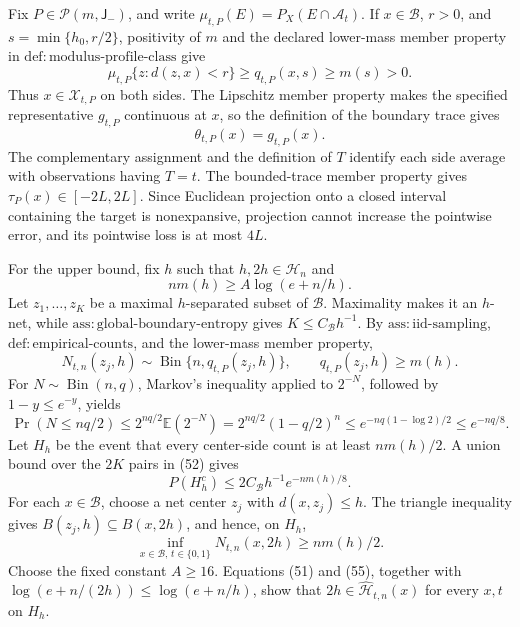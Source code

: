 Fix \(P\in\mathcal P(m,\mathsf J_{-})\), and write \(\mu_{t,P}(E)=P_X(E\cap\mathcal A_t)\). If \(x\in\mathcal B\), \(r>0\), and \(s=\min\{h_0,r/2\}\), positivity of \(m\) and the declared lower-mass member property in \(\mathrm{def:modulus\text{-}profile\text{-}class}\) give
\[
 \mu_{t,P}\{z:d(z,x)<r\}\ge q_{t,P}(x,s)\ge m(s)>0. \tag{49}
\]
Thus \(x\in\mathcal X_{t,P}\) on both sides. The Lipschitz member property makes the specified representative \(g_{t,P}\) continuous at \(x\), so the definition of the boundary trace gives
\[
 \theta_{t,P}(x)=g_{t,P}(x). \tag{50}
\]
The complementary assignment and the definition of \(T\) identify each side average with observations having \(T=t\). The bounded-trace member property gives \(\tau_P(x)\in[-2L,2L]\). Since Euclidean projection onto a closed interval containing the target is nonexpansive, projection cannot increase the pointwise error, and its pointwise loss is at most \(4L\).

For the upper bound, fix \(h\) such that \(h,2h\in\mathcal H_n\) and
\[
 nm(h)\ge A\log(e+n/h). \tag{51}
\]
Let \(z_1,\ldots,z_K\) be a maximal \(h\)-separated subset of \(\mathcal B\). Maximality makes it an \(h\)-net, while \(\mathrm{ass:global\text{-}boundary\text{-}entropy}\) gives \(K\le C_{\mathcal B}h^{-1}\). By \(\mathrm{ass:iid\text{-}sampling}\), \(\mathrm{def:empirical\text{-}counts}\), and the lower-mass member property,
\[
 N_{t,n}(z_j,h)\sim\operatorname{Bin}\{n,q_{t,P}(z_j,h)\},
 \qquad q_{t,P}(z_j,h)\ge m(h). \tag{52}
\]
For \(N\sim\operatorname{Bin}(n,q)\), Markov's inequality applied to \(2^{-N}\), followed by \(1-y\le e^{-y}\), yields
\[
 \Pr(N\le nq/2)
 \le 2^{nq/2}\mathbb E(2^{-N})
 =2^{nq/2}(1-q/2)^n
 \le e^{-nq(1-\log 2)/2}
 \le e^{-nq/8}. \tag{53}
\]
Let \(H_h\) be the event that every center-side count is at least \(nm(h)/2\). A union bound over the \(2K\) pairs in (52) gives
\[
 P(H_h^c)\le2C_{\mathcal B}h^{-1}e^{-nm(h)/8}. \tag{54}
\]
For each \(x\in\mathcal B\), choose a net center \(z_j\) with \(d(x,z_j)\le h\). The triangle inequality gives \(B(z_j,h)\subseteq B(x,2h)\), and hence, on \(H_h\),
\[
 \inf_{x\in\mathcal B,\,t\in\{0,1\}}N_{t,n}(x,2h)\ge nm(h)/2. \tag{55}
\]
Choose the fixed constant \(A\ge16\). Equations (51) and (55), together with \(\log(e+n/(2h))\le\log(e+n/h)\), show that \(2h\in\widehat{\mathcal H}_{t,n}(x)\) for every \(x,t\) on \(H_h\).

